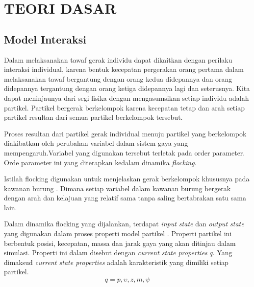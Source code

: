 %
%
%
\chapter{TEORI DASAR}\label{cha:teori}


\section{Model Interaksi}\label{sec:modelinteraksi}
\hspace {0.5cm}Dalam melaksanakan tawaf gerak individu dapat dikaitkan dengan perilaku interaksi individual, karena bentuk kecepatan pergerakan orang pertama dalam melaksanakan tawaf bergantung dengan orang kedua didepannya dan orang didepannya tergantung dengan orang ketiga didepannya lagi dan seterusnya. Kita dapat meninjaunya dari segi fisika dengan mengasumsikan setiap individu adalah partikel. Partikel bergerak berkelompok karena kecepatan tetap dan arah setiap partikel resultan dari semua partikel berkelompok tersebut.

\hspace {0.5cm}Proses resultan dari partikel gerak individual menuju partikel yang berkelompok diakibatkan oleh perubahan variabel dalam sistem gaya yang mempengaruh.Variabel yang digunakan tersebut terletak pada order parameter. Orde parameter ini yang diterapkan kedalam dinamika \textit{flocking}.

\hspace {0.5cm}Istilah flocking digunakan untuk menjelaskan gerak berkelompok khususnya pada kawanan burung \citep{Toner1998}. Dimana setiap variabel dalam kawanan burung bergerak dengan arah dan kelajuan yang relatif sama tanpa saling bertabrakan satu sama lain.



\hspace {0.5cm}Dalam dinamika flocking yang dijalankan, terdapat \textit{input state} dan \textit{output state} yang digunakan dalam proses properti model partikel . Properti partikel ini berbentuk posisi, kecepatan, massa dan jarak gaya yang akan ditinjau dalam simulasi. Properti ini dalam \citep{Bajec2007} disebut dengan \textit{current state properties}  $q$. Yang dimaksud \textit{current state properties} adalah karakteristik yang dimiliki setiap partikel.
\begin{equation}
q = {p,\upsilon,z,m,\psi} 
\end{equation}




